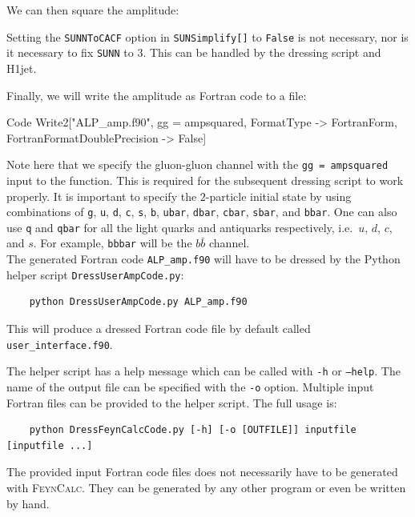 \documentclass[12pt,a4wide]{article}
\begin{document}
We can then square the amplitude: 
Setting the \texttt{SUNNToCACF} option in \texttt{SUNSimplify[]} to \texttt{False} is not necessary, nor is it necessary to fix \texttt{SUNN} to $3$. This can be handled by the dressing script and H1jet. 

Finally, we will write the amplitude as Fortran code to a file: 
\begin{mmaCell}{Code}
Write2["ALP_amp.f90", gg = ampsquared, FormatType -> FortranForm, FortranFormatDoublePrecision -> False] 
\end{mmaCell}
Note here that we specify the gluon-gluon channel with the \texttt{gg = ampsquared} input to the function. This is required for the subsequent dressing script to work properly. It is important to specify the $2$-particle initial state by using combinations of \texttt{g}, \texttt{u}, \texttt{d}, \texttt{c}, \texttt{s}, \texttt{b}, \texttt{ubar}, \texttt{dbar}, \texttt{cbar}, \texttt{sbar}, and \texttt{bbar}. One can also use \texttt{q} and \texttt{qbar} for all the light quarks and antiquarks respectively, i.e.\ $u$, $d$, $c$, and $s$. For example, \texttt{bbbar} will be the $b\bar{b}$ channel. \\ 

The generated Fortran code \texttt{ALP\_amp.f90} will have to be dressed by the Python helper script \texttt{DressUserAmpCode.py}: 
\begin{lstlisting}
	python DressUserAmpCode.py ALP_amp.f90 
\end{lstlisting}
This will produce a dressed Fortran code file by default called \texttt{user\_interface.f90}. 

The helper script has a help message which can be called with \texttt{-h} or \texttt{--help}. The name of the output file can be specified with the \texttt{-o} option. Multiple input Fortran files can be provided to the helper script. The full usage is: 
\begin{lstlisting}
	python DressFeynCalcCode.py [-h] [-o [OUTFILE]] inputfile [inputfile ...] 
\end{lstlisting}
The provided input Fortran code files does not necessarily have to be generated with \textsc{FeynCalc}. They can be generated by any other program or even be written by hand. \\ 
\end{document}
